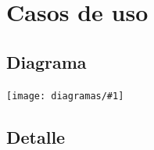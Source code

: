 \documentclass[a4paper, 10pt, twoside]{article}
\newcommand{\diagramav}[1]{%
  \texttt{[image: diagramas/\#1]}%
}
\begin{document}




\newpage


\section{Casos de uso}


\subsection{Diagrama}

\diagramav{cu}


\subsection{Detalle}
\end{document}
